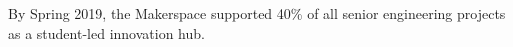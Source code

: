 \begin{cventries}
{\begin{cvitems}
        \item {By Spring 2019, the Makerspace supported 40\% of all senior engineering projects as a student-led innovation hub.}
     \end{cvitems}
    }

\end{cventries}
